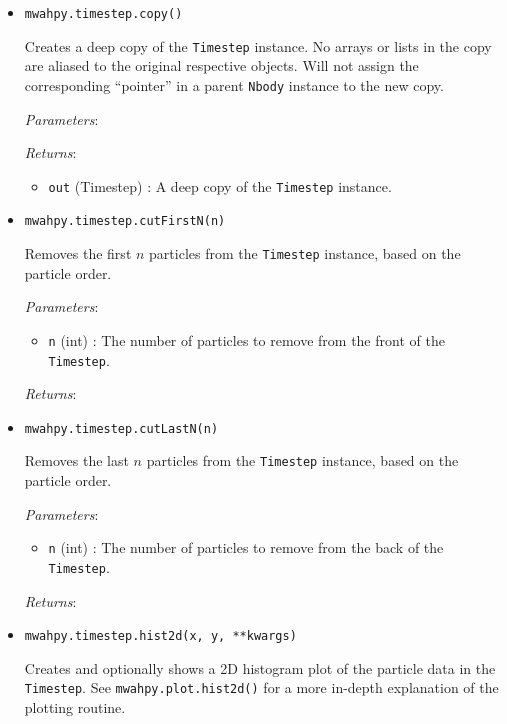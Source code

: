 \documentclass{article}
\begin{document}
\begin{itemize}
\item \verb!mwahpy.timestep.copy()!

Creates a deep copy of the \verb!Timestep! instance. No arrays or lists in the copy are aliased to the original respective objects. Will not assign the corresponding ``pointer'' in a parent \verb!Nbody! instance to the new copy. 

\textit{Parameters}: 

\textit{Returns}: \begin{itemize} 

\item \verb!out! (Timestep) : A deep copy of the \verb!Timestep! instance.

\end{itemize}



\item \verb!mwahpy.timestep.cutFirstN(n)!

Removes the first $n$ particles from the \verb!Timestep! instance, based on the particle order. 

\textit{Parameters}: \begin{itemize}

\item \verb!n! (int) : The number of particles to remove from the front of the \verb!Timestep!.

\end{itemize}

\textit{Returns}: 



\item \verb!mwahpy.timestep.cutLastN(n)!

Removes the last $n$ particles from the \verb!Timestep! instance, based on the particle order. 

\textit{Parameters}: \begin{itemize}

\item \verb!n! (int) : The number of particles to remove from the back of the \verb!Timestep!.

\end{itemize}

\textit{Returns}: 



\item \verb!mwahpy.timestep.hist2d(x, y, **kwargs)!

Creates and optionally shows a 2D histogram plot of the particle data in the \verb!Timestep!. See \verb!mwahpy.plot.hist2d()! for a more in-depth explanation of the plotting routine.


\end{itemize}
\end{document}
